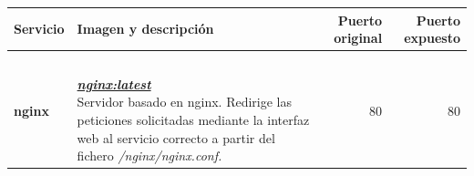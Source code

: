 \documentclass{report}
\begin{document}
        \begin{table}[H]
            \centering
            \begin{tabularx}{\textwidth}{lXrr}
                \toprule
                \textbf{Servicio} & \textbf{Imagen y descripción} & \textbf{Puerto original} & \textbf{Puerto expuesto} \\
                \midrule
                \\ \textbf{nginx} & {\parbox{5cm}{\\ \textit{\textbf{\href{https://hub.docker.com/_/nginx}{nginx:latest}}}\\Servidor basado en nginx. Redirige las peticiones solicitadas mediante la interfaz web al servicio correcto a partir del fichero \textit{/nginx/nginx.conf.}}} & 80 & 80 \\
                

\end{tabularx}
\end{table}
\end{document}
